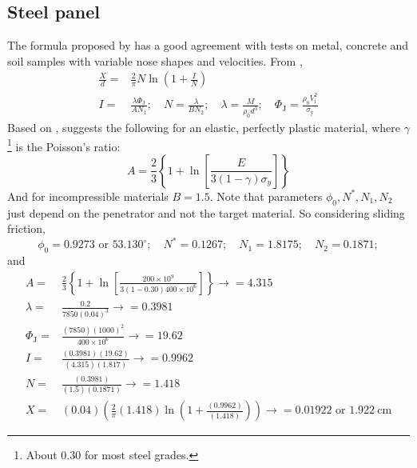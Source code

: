 \documentclass[]{article} %
\begin{document}
\subsection*{Steel panel}
The formula proposed by \cite{chen2002deep} has a good agreement with tests on metal, concrete and soil samples with variable nose shapes and velocities. From \cite{li2003dimensionless},
\begin{equation}\nonumber
\begin{aligned}
  \frac{X}{d}=&\frac{2}{\pi} N \ln \left(1+\frac{I}{N}\right)\\
  I=&\frac{\lambda \Phi_{\mathrm{J}}}{A N_1} ; \quad N=\frac{\lambda}{B N_2} ; \quad \lambda=\frac{M}{\rho_0 d^3} ; \quad \Phi_{\mathrm{J}}=\frac{\rho_0 V_{\mathrm{i}}^2}{\sigma_{\mathrm{y}}}
\end{aligned}
  \end{equation}
Based on \cite{forrestal1988dynamic}, \cite{li2003dimensionless} suggests the following for an elastic, perfectly plastic material, where $\gamma$\footnote{About 0.30 for most steel grades.} is the Poisson’s ratio:
\begin{equation}\nonumber
A=\frac{2}{3}\left\{1+\ln \left[\frac{{E}}{3(1-{\gamma}) {\sigma_y}}\right]\right\}
\end{equation}
And for incompressible materials $B=1.5$. Note that parameters $\phi_0, N^*, N_1, N_2$ just depend on the penetrator and not the target material.
So considering sliding friction,
\begin{equation}\nonumber
  \phi_0  =0.9273 \text { or } 53.130^{\circ} ; \quad N^*=0.1267 ; \quad N_1=1.8175 ; \quad N_2=0.1871;
\end{equation}
and
\begin{equation}\nonumber
  \begin{aligned}
  A  =&\frac{2}{3}\left\{1+\ln \left[\frac{{200 \times 10^9}}{3(1-{0.30}) {400 \times 10^6}}\right]\right\} \rightarrow=4.315 \\
  \lambda  =&\frac{0.2}{7850(0.04)^3} \rightarrow=0.3981 \\
  \Phi_{\mathrm{J}}  =&\frac{(7850)(1000)^2}{{400 \times 10^6}} \rightarrow=19.62 \\
  I  =&\frac{(0.3981)(19.62)}{(4.315)(1.817)} \rightarrow=0.9962 \\
  N =& \frac{(0.3981)}{(1.5)(0.1871)} \rightarrow=1.418 \\
  X  =&(0.04)\left(\frac{2}{\pi}(1.418) \ln \left(1+\frac{(0.9962)}{(1.418)}\right)\right) \rightarrow=0.01922 \text { or } 1.922 \mathrm{~cm}
  \end{aligned}
\end{equation}
\end{document}
